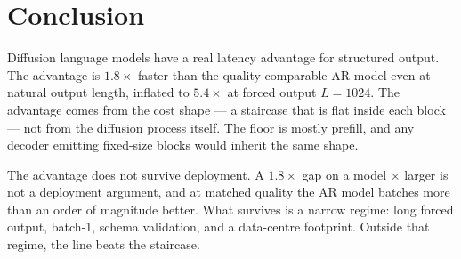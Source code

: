 \section{Conclusion}
\label{sec:conclusion}

Diffusion language models have a real latency advantage for structured
output. The advantage is $1.8\times$ faster than the quality-comparable
AR model even at natural output length, inflated to $5.4\times$ at forced
output $L{=}1024$. The advantage comes from the cost shape --- a staircase
that is flat inside each block --- not from the diffusion process itself.
The floor is mostly prefill, and any decoder emitting fixed-size blocks
would inherit the same shape.

The advantage does not survive deployment. A $1.8\times$ gap on a model
\footprintRatio$\times$ larger is not a deployment argument, and at matched
quality the AR model batches more than an order of magnitude better. What
survives is a narrow regime: long forced output, batch-1, schema
validation, and a data-centre footprint. Outside that regime, the line
beats the staircase.
